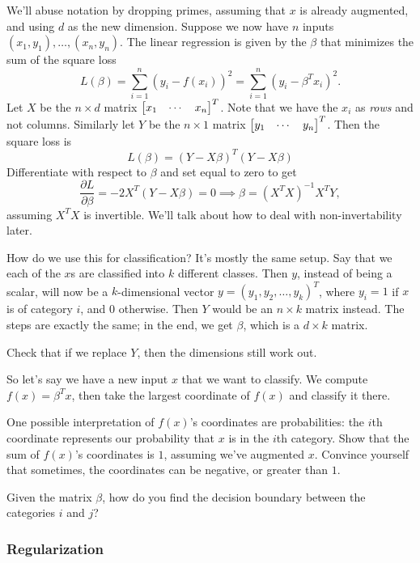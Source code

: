\documentclass[11pt,paper=letter]{scrartcl}
\begin{document}
We'll abuse notation by dropping primes, assuming that $x$ is already augmented, and using $d$ as the new dimension. Suppose we now have $n$ inputs $(x_1, y_1), \ldots, (x_n, y_n)$. The linear regression is given by the $\beta$ that minimizes the sum of the square loss\[
  L(\beta) = \sum_{i=1}^n \left(y_i - f(x_i)\right)^2 = \sum_{i=1}^n\left(y_i - \beta^Tx_i\right)^2.
\]
Let $X$ be the $n \times d$ matrix $\begin{bmatrix}x_1 & \cdots & x_n\end{bmatrix}^T$. Note that we have the $x_i$ as \textit{rows} and not columns. Similarly let $Y$ be the $n \times 1$ matrix $\begin{bmatrix}y_1 & \cdots & y_n\end{bmatrix}^T$. Then the square loss is\[
  L(\beta) = (Y - X\beta)^T(Y - X\beta) %
\]
Differentiate with respect to $\beta$ and set equal to zero to get\[
  \frac{\partial L}{\partial \beta} = -2X^T(Y - X\beta) = 0 \implies \beta = (X^TX)^{-1}X^TY, %
\]
assuming $X^TX$ is invertible. We'll talk about how to deal with non-invertability later.

How do we use this for classification? It's mostly the same setup. Say that we each of the $x$s are classified into $k$ different classes. Then $y$, instead of being a scalar, will now be a $k$-dimensional vector $y = (y_1, y_2, \ldots, y_k)^T$, where $y_i = 1$ if $x$ is of category $i$, and $0$ otherwise. Then $Y$ would be an $n \times k$ matrix instead. The steps are exactly the same; in the end, we get $\beta$, which is a $d \times k$ matrix.
\begin{exrboxed}
  Check that if we replace $Y$, then the dimensions still work out.
\end{exrboxed}
So let's say we have a new input $x$ that we want to classify. We compute $f(x) = \beta^Tx$, then take the largest coordinate of $f(x)$ and classify it there.
\begin{exrboxed}
  One possible interpretation of $f(x)$'s coordinates are probabilities: the $i$th coordinate represents our probability that $x$ is in the $i$th category. Show that the sum of $f(x)$'s coordinates is $1$, assuming we've augmented $x$. Convince yourself that sometimes, the coordinates can be negative, or greater than $1$.
\end{exrboxed}
\vspace{-1em}
\begin{exrboxed}
  Given the matrix $\beta$, how do you find the decision boundary between the categories $i$ and $j$?
\end{exrboxed}

\subsubsection*{Regularization}
\end{document}
